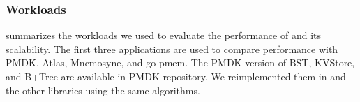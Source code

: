 \subsubsection{Workloads}
\label{sec:res:perf:workload}

 summarizes the workloads we used to evaluate the performance of \this{} and its scalability.  The first three applications are used to compare performance with PMDK, Atlas, Mnemosyne, and go-pmem. The PMDK version of BST, KVStore, and B+Tree are available in PMDK repository. We reimplemented them in \this{} and the other libraries using the same algorithms.




